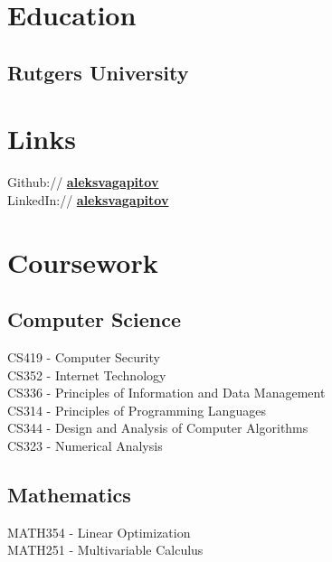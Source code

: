 \documentclass[]{Resume}
\begin{document}
\begin{minipage}[t]{0.33\textwidth} 


\section{Education} 

\subsection{Rutgers University}
\sectionsep



\section{Links} 
Github:// \href{https://github.com/aleksvagapitov}{\bf aleksvagapitov} \\
LinkedIn://  \href{https://www.linkedin.com/in/aleksvagapitov//}{\bf aleksvagapitov}


\section{Coursework}

\subsection{Computer Science}
CS419 - Computer Security \\
CS352 - Internet Technology \\
CS336 - Principles of Information and Data Management \\
CS314 - Principles of Programming Languages \\
CS344 - Design and Analysis of Computer Algorithms \\
CS323 - Numerical Analysis \\
\sectionsep
\subsection{Mathematics}
MATH354 - Linear Optimization \\
MATH251 - Multivariable Calculus


\end{minipage}
\end{document}
